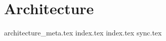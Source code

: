 \chapter{Architecture}\label{cha:architecture}
{architecture_meta.tex}
{index.tex}
{index.tex}
{sync.tex}
